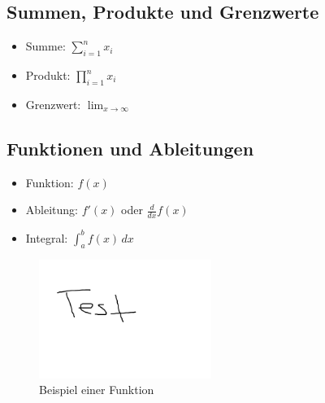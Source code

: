 \subsection{Summen, Produkte und Grenzwerte}
\begin{itemize}
    \item Summe: $\sum_{i=1}^{n} x_i$
    \item Produkt: $\prod_{i=1}^{n} x_i$
    \item Grenzwert: $\lim_{x \to \infty}$
\end{itemize}
\subsection{Funktionen und Ableitungen}
\begin{itemize}
    \item Funktion: $f(x)$
    \item Ableitung: $f'(x)$ oder $\frac{d}{dx} f(x)$
    \item Integral: $\int_{a}^{b} f(x) \,dx$
\end{itemize}

\begin{figure}[h]
    \centering
    \includegraphics[width=0.5\textwidth]{img/test.png} %
    \caption{Beispiel einer Funktion}
    \label{fig:fkt}
\end{figure}